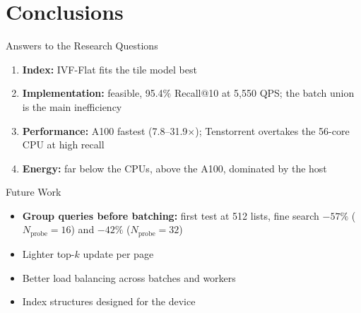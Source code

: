 \section{Conclusions}

\begin{frame}{Answers to the Research Questions}
  \begin{enumerate}\small
    \item \textbf{Index:} IVF-Flat fits the tile model best
    \item \textbf{Implementation:} feasible, 95.4\% Recall@10 at 5,550 QPS; the batch union is the main inefficiency
    \item \textbf{Performance:} A100 fastest (7.8--31.9$\times$); Tenstorrent overtakes the 56-core CPU at high recall
    \item \textbf{Energy:} far below the CPUs, above the A100, dominated by the host
  \end{enumerate}
\end{frame}

\begin{frame}{Future Work}
  \begin{itemize}
    \item \textbf{Group queries before batching:} first test at 512 lists, fine search $-57\%$ ($N_{\mathrm{probe}}=16$) and $-42\%$ ($N_{\mathrm{probe}}=32$)
    \item Lighter top-$k$ update per page
    \item Better load balancing across batches and workers
    \item Index structures designed for the device
  \end{itemize}
\end{frame}
